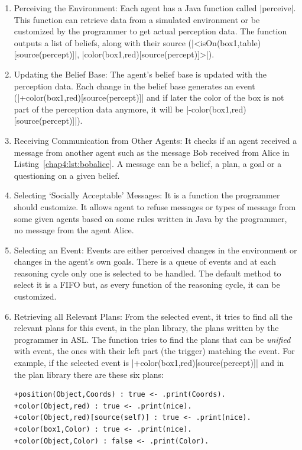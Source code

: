 \documentclass[a4paper,11pt,twoside]{StyleThese}
\begin{document}
\begin{enumerate}
	\item Perceiving the Environment: Each agent has a Java function called |perceive|. This function can retrieve data from a simulated environment or be customized by the programmer to get actual perception data. The function outputs a list of beliefs, along with their source (\eg |<isOn(box1,table)[source(percept)]|, |color(box1,red)[source(percept)]>|).
	\item Updating the Belief Base: The agent's belief base is updated with the perception data. Each change in the belief base generates an event (\eg |+color(box1,red)[source(percept)]| and if later the color of the box is not part of the perception data anymore, it will be |-color(box1,red)[source(percept)]|).\label{chap4:list:update_bb}
	\item Receiving Communication from Other Agents: It checks if an agent received a message from another agent such as the message Bob received from Alice in Listing~\ref{chap4:lst:bobalice}. A message can be a belief, a plan, a goal or a questioning on a given belief.
	\item Selecting ‘Socially Acceptable’ Messages: It is a function the programmer should customize. It allows agent to refuse messages or types of message from some given agents based on some rules written in Java by the programmer, \eg no message from the agent Alice.
	\item Selecting an Event: Events are either perceived changes in the environment or changes in the agent's own goals. There is a queue of events and at each reasoning cycle only one is selected to be handled. The default method to select it is a FIFO but, as every function of the reasoning cycle, it can be customized. 
	\item Retrieving all Relevant Plans: From the selected event, it tries to find all the relevant plans for this event, in the plan library, \ie the plans written by the programmer in ASL. The function tries to find the plans that can be \textit{unified} with event, \ie the ones with their left part (the trigger) matching the event. For example, if the selected event is |+color(box1,red)[source(percept)]| and in the plan library there are these six plans:
\begin{lstlisting}[style=inline]
+position(Object,Coords) : true <- .print(Coords).
+color(Object,red) : true <- .print(nice).
+color(Object,red)[source(self)] : true <- .print(nice).
+color(box1,Color) : true <- .print(nice).
+color(Object,Color) : false <- .print(Color).

\end{lstlisting}
\end{enumerate}
\end{document}
